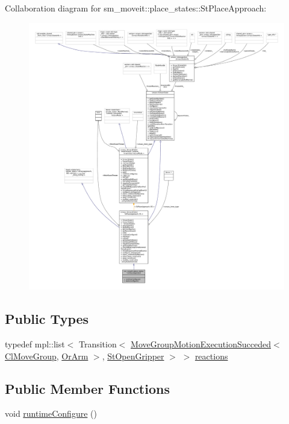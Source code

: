 Collaboration diagram for sm\+\_\+moveit\+:\+:place\+\_\+states\+:\+:St\+Place\+Approach\+:
\nopagebreak
\begin{figure}[H]
\begin{center}
\leavevmode
\includegraphics[width=350pt]{structsm__moveit_1_1place__states_1_1StPlaceApproach__coll__graph}
\end{center}
\end{figure}
\subsection*{Public Types}
\begin{DoxyCompactItemize}
\item 
typedef mpl\+::list$<$ Transition$<$ \hyperlink{structsm__moveit_1_1cl__movegroup_1_1MoveGroupMotionExecutionSucceded}{Move\+Group\+Motion\+Execution\+Succeded}$<$ \hyperlink{classsm__moveit_1_1cl__movegroup_1_1ClMoveGroup}{Cl\+Move\+Group}, \hyperlink{classsm__moveit_1_1OrArm}{Or\+Arm} $>$, \hyperlink{structsm__moveit_1_1place__states_1_1StOpenGripper}{St\+Open\+Gripper} $>$ $>$ \hyperlink{structsm__moveit_1_1place__states_1_1StPlaceApproach_a5101ce63b524c926311a847390764fc2}{reactions}
\end{DoxyCompactItemize}
\subsection*{Public Member Functions}
\begin{DoxyCompactItemize}
\item 
void \hyperlink{structsm__moveit_1_1place__states_1_1StPlaceApproach_a287b39f8eb6a5aca4f0b1e63cb275f7a}{runtime\+Configure} ()
\end{DoxyCompactItemize}
